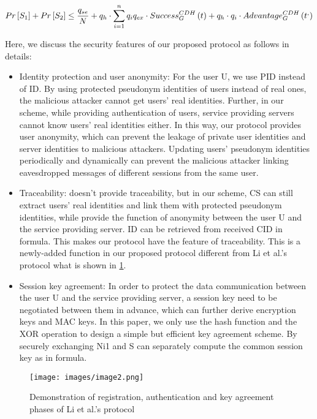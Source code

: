 \documentclass[fleqn]{Paquetes/RevDigMatEduInt}
\begin{document}
\begin{equation}
    \centering
	Pr \left[S_{1}\right] + Pr\left[S_{2}\right] \le \frac{q_{se}}{N} + q_{h} \cdot \sum_{i=1}^{n} q_{i}q_{ex} \cdot Success_{G}^{CDH} \left(t\right) + q_{h} \cdot q_{i} \cdot Advantage_{G}^{CDH} \left(t^{,}\right)
	\label{eqn: 1}
\end{equation}

Here, we discuss the security features of our proposed protocol as follows in details:
\begin{itemize}[label=$-$]
\item Identity protection and user anonymity: For the user U, we use PID instead of ID. By using protected pseudonym identities of users instead of real ones, the malicious attacker cannot get users’ real identities. Further, in our scheme, while providing authentication of users, service providing servers cannot know users’ real identities either. In this way, our protocol provides user anonymity, which can prevent the leakage of private user identities and server identities to malicious attackers. Updating users’ pseudonym identities periodically and dynamically can prevent the malicious attacker linking eavesdropped messages of different sessions from the same user.
\item Traceability: doesn’t provide traceability, but in our scheme, CS can still extract users’ real identities and link them with protected pseudonym identities, while provide the function of anonymity between the user U and the service providing server. ID can be retrieved from received CID in formula. This makes our protocol have the feature of traceability. This is a newly-added function in our proposed protocol different from Li et al.’s protocol what is shown in \ref{fig:2}.
\item Session key agreement: In order to protect the data communication between the user U and the service providing server, a session key need to be negotiated between them in advance, which can further derive encryption keys and MAC keys. In this paper, we only use the hash function and the XOR operation to design a simple but efficient key agreement scheme. By securely exchanging Ni1 and S can separately compute the common session key as in formula.
\end{itemize}



\begin{figure} [H]
    \centering
    \texttt{[image: images/image2.png]}
    \caption{Demonstration of registration, authentication and key agreement phases of Li et al.’s protocol}
    \label{fig:2}
\end{figure}
\end{document}
